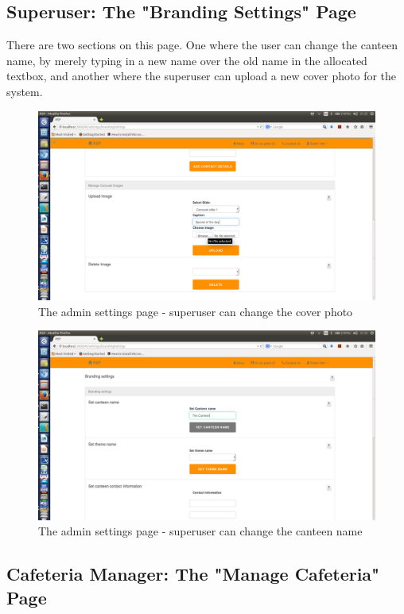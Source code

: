 \documentclass[a4paper,12pt]{article}
\begin{document}
\subsection{Superuser: The "Branding Settings" Page} 
There are two sections on this page. One where the user can change the canteen name, by merely typing in a new name over the old name in the allocated textbox, and another where the superuser can upload a new cover photo for the system.

\begin{figure}[H]
  \centering
    \includegraphics[width=1.0\textwidth]{screenshots/coverImage.png}
    \caption{The admin settings page - superuser can change the cover photo} 
\end{figure}

\begin{figure}[H]
  \centering
    \includegraphics[width=1.0\textwidth]{screenshots/canteenName.png}
    \caption{The admin settings page - superuser can change the canteen name}
\end{figure}

\subsection{Cafeteria Manager: The "Manage Cafeteria" Page}
\end{document}
